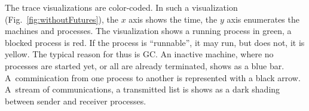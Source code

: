 The trace visualizations are color-coded. In such a visualization (Fig.~\ref{fig:withoutFutures}), the $x$ axis shows the time, the $y$ axis enumerates the machines and processes. The visualization shows a running process in green, a blocked process is red. If the process is \enquote{runnable}, \ie it may run, but does not, it is yellow. The typical reason for thus is GC. An inactive machine, where no processes are started yet, or all are already terminated, shows as a blue bar. A~comminication from one process to another is represented with a black arrow. A~stream of communications, \eg a transmitted list is shows as a dark shading between sender and receiver processes.


